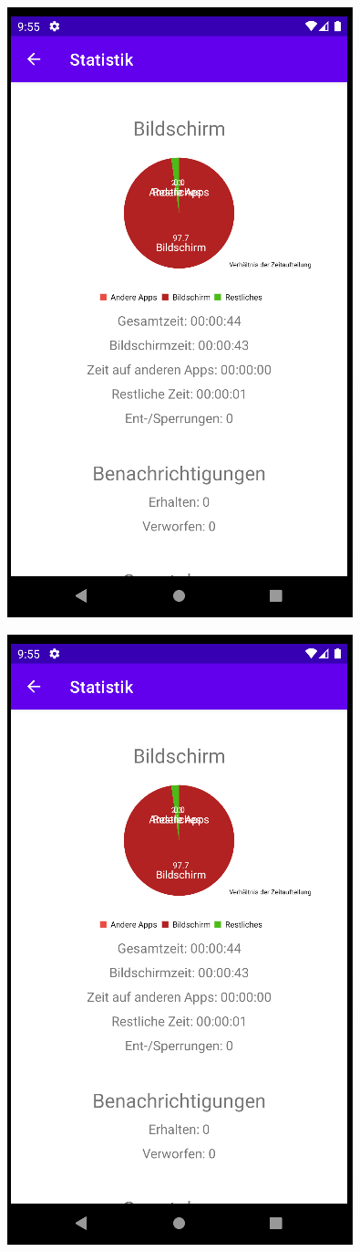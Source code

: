 \documentclass[ngerman]{tutorial}
\begin{document}
\begin{center}
    \includegraphics[scale=0.45]{stats_complete_1.png}
\end{center}
\begin{center}
    \includegraphics[scale=0.45]{stats_complete_1.png}
\end{center}
\end{document}
